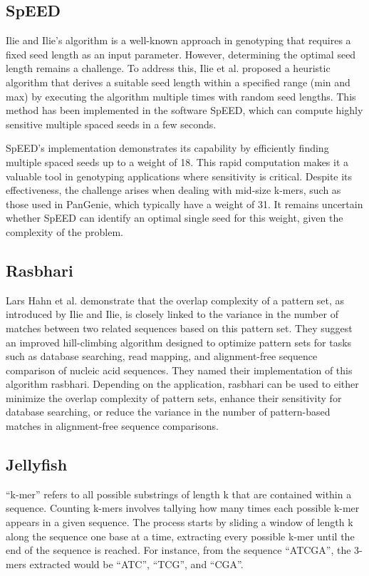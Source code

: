 \documentclass[PhD]{PHlab-thesis}
\begin{document}
\subsection{SpEED}
Ilie and Ilie's algorithm is a well-known approach in genotyping that requires a fixed seed length as an input parameter. However, determining the optimal seed length remains a challenge. To address this, Ilie et al. proposed a heuristic algorithm that derives a suitable seed length within a specified range (min and max) by executing the algorithm multiple times with random seed lengths. This method has been implemented in the software SpEED, which can compute highly sensitive multiple spaced seeds in a few seconds.

SpEED's implementation demonstrates its capability by efficiently finding multiple spaced seeds up to a weight of 18. This rapid computation makes it a valuable tool in genotyping applications where sensitivity is critical. Despite its effectiveness, the challenge arises when dealing with mid-size k-mers, such as those used in PanGenie, which typically have a weight of 31. It remains uncertain whether SpEED can identify an optimal single seed for this weight, given the complexity of the problem.

\subsection{Rasbhari}
Lars Hahn et al. demonstrate that the overlap complexity of a pattern set, as introduced by Ilie and Ilie, is closely linked to the variance in the number of matches between two related sequences based on this pattern set. They suggest an improved hill-climbing algorithm designed to optimize pattern sets for tasks such as database searching, read mapping, and alignment-free sequence comparison of nucleic acid sequences. They named their implementation of this algorithm rasbhari. Depending on the application, rasbhari can be used to either minimize the overlap complexity of pattern sets, enhance their sensitivity for database searching, or reduce the variance in the number of pattern-based matches in alignment-free sequence comparisons.

\subsection{Jellyfish}
 ``k-mer'' refers to all possible substrings of length k that are contained within a sequence. Counting k-mers involves tallying how many times each possible k-mer appears in a given sequence. The process starts by sliding a window of length k along the sequence one base at a time, extracting every possible k-mer until the end of the sequence is reached. For instance, from the sequence ``ATCGA'', the 3-mers extracted would be ``ATC'', ``TCG'', and ``CGA''.
\end{document}
